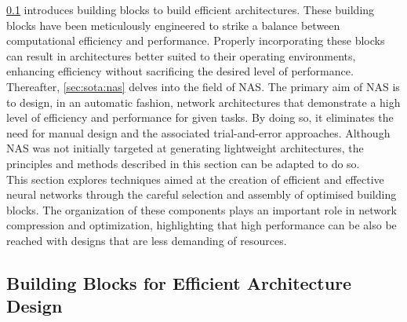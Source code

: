\cref{sec:sota:efficient_archi} introduces building blocks to build efficient
architectures. These building blocks have been meticulously engineered to strike
a balance between computational efficiency and performance. Properly
incorporating these blocks can result in architectures better suited to their
operating environments, enhancing efficiency without sacrificing the desired
level of performance.\\

Thereafter, \cref{sec:sota:nas} delves into the field of \ac{NAS}. The primary
aim of \ac{NAS} is to design, in an automatic fashion, network architectures
that demonstrate a high level of efficiency and performance for given tasks. By
doing so, it eliminates the need for manual design and the associated
trial-and-error approaches. Although \ac{NAS} was not initially targeted at
generating lightweight architectures, the principles and methods described in
this section can be adapted to do so. \\

This section explores techniques aimed at the creation of efficient and
effective neural networks through the careful selection and assembly of
optimised building blocks. The organization of these components plays an
important role in network compression and optimization, highlighting that high
performance can be also be reached with designs that are less demanding of
resources.\\

\subsection{Building Blocks for Efficient Architecture Design}\label{sec:sota:efficient_archi}

